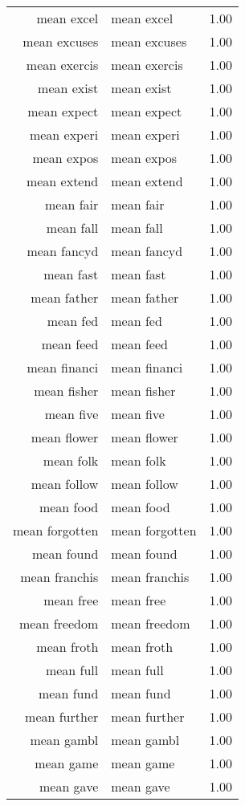 \begin{table}[ht]
\begin{tabular}{rlr}
  mean excel & mean excel & 1.00 \\ 
  mean excuses & mean excuses & 1.00 \\ 
  mean exercis & mean exercis & 1.00 \\ 
  mean exist & mean exist & 1.00 \\ 
  mean expect & mean expect & 1.00 \\ 
  mean experi & mean experi & 1.00 \\ 
  mean expos & mean expos & 1.00 \\ 
  mean extend & mean extend & 1.00 \\ 
  mean fair & mean fair & 1.00 \\ 
  mean fall & mean fall & 1.00 \\ 
  mean fancyd & mean fancyd & 1.00 \\ 
  mean fast & mean fast & 1.00 \\ 
  mean father & mean father & 1.00 \\ 
  mean fed & mean fed & 1.00 \\ 
  mean feed & mean feed & 1.00 \\ 
  mean financi & mean financi & 1.00 \\ 
  mean fisher & mean fisher & 1.00 \\ 
  mean five & mean five & 1.00 \\ 
  mean flower & mean flower & 1.00 \\ 
  mean folk & mean folk & 1.00 \\ 
  mean follow & mean follow & 1.00 \\ 
  mean food & mean food & 1.00 \\ 
  mean forgotten & mean forgotten & 1.00 \\ 
  mean found & mean found & 1.00 \\ 
  mean franchis & mean franchis & 1.00 \\ 
  mean free & mean free & 1.00 \\ 
  mean freedom & mean freedom & 1.00 \\ 
  mean froth & mean froth & 1.00 \\ 
  mean full & mean full & 1.00 \\ 
  mean fund & mean fund & 1.00 \\ 
  mean further & mean further & 1.00 \\ 
  mean gambl & mean gambl & 1.00 \\ 
  mean game & mean game & 1.00 \\ 
  mean gave & mean gave & 1.00 \\ 

\end{tabular}
\end{table}
